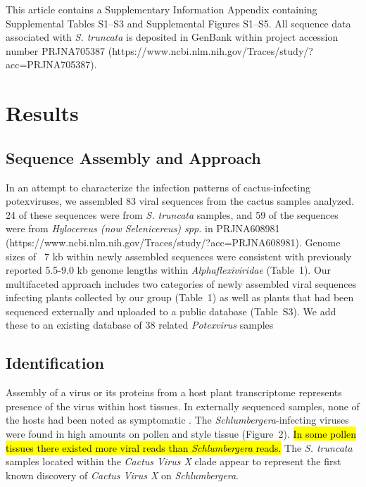 \documentclass[fleqn,10pt,lineno]{wlpeerj}
\begin{document}
This article contains a Supplementary Information Appendix containing Supplemental Tables S1--S3 and Supplemental Figures S1--S5. 
All sequence data associated with \textit{S. truncata} is deposited in GenBank within project accession number PRJNA705387 (https://www.ncbi.nlm.nih.gov/Traces/study/?acc=PRJNA705387).


\section*{Results}
\subsection*{Sequence Assembly and Approach}
In an attempt to characterize the infection patterns of cactus-infecting potexviruses, we assembled 83 viral sequences from the cactus samples analyzed. 
24 of these sequences were from \textit{S. truncata} samples, and 59 of the sequences were from \textit{Hylocereus (now Selenicereus) spp.} in PRJNA608981 (https://www.ncbi.nlm.nih.gov/Traces/study/?acc=PRJNA608981)\citep{fan2020retracted}.
Genome sizes of ~7 kb within newly assembled sequences were consistent with previously reported 5.5-9.0 kb genome lengths within \textit{Alphaflexiviridae} \citep{kreuze_ictv_2020,ICTV_potexviruses}(Table~1).
Our multifaceted approach includes two categories of newly assembled viral sequences infecting plants collected by our group (Table~1) as well as plants that had been sequenced externally and uploaded to a public database (Table~S3).
We add these to an existing database of 38 related \textit{Potexvirus} samples

 

\subsection*{Identification}
Assembly of a virus or its proteins from a host plant transcriptome represents presence of the virus within host tissues. 
In externally sequenced samples, none of the hosts had been noted as symptomatic \citep{fan2020retracted}.
The \textit{Schlumbergera}-infecting viruses were found in high amounts on pollen and style tissue (Figure~2).
\hl{In some pollen tissues there existed more viral reads than \textit{Schlumbergera} reads.}
The \textit{S. truncata} samples located within the \textit{Cactus Virus X} clade appear to represent the first known discovery of \textit{Cactus Virus X} on \textit{Schlumbergera}.
\end{document}
